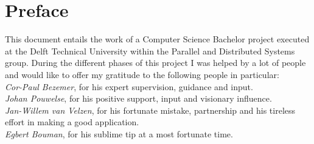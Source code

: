 \chapter*{Preface}
This document entails the work of a Computer Science Bachelor project executed at the Delft Technical University within the Parallel and Distributed Systems group. During the different phases of this project I was helped by a lot of people and would like to offer my gratitude to the following people in particular: \\

\emph{Cor-Paul Bezemer}, for his expert supervision, guidance and input.\\

\emph{Johan Pouwelse}, for his positive support, input and visionary influence.\\

\emph{Jan-Willem van Velzen}, for his fortunate mistake, partnership and his tireless effort in making a good application.\\

\emph{Egbert Bouman}, for his sublime tip at a most fortunate time.\\